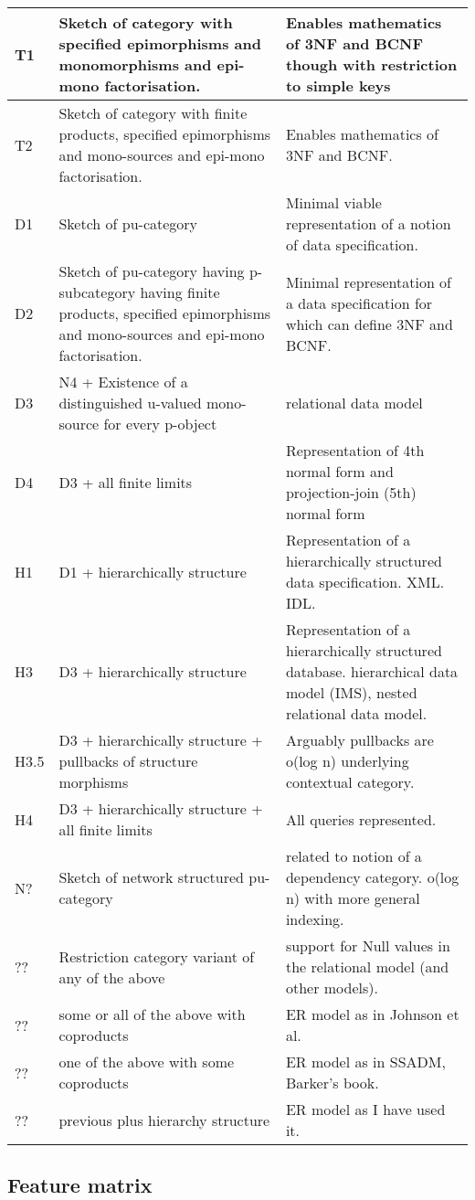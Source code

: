 \documentclass[10pt,a4paper]{article}
\theoremstyle{remark}
\begin{document}
\begin{tabular}{|l|p{6cm}|p{6cm}|}
\hline
T1 & Sketch of category with specified epimorphisms and monomorphisms and epi-mono factorisation.
   & Enables mathematics of 3NF and BCNF though with restriction to simple keys \\
\hline
T2 & Sketch of category with finite products, specified epimorphisms and mono-sources and epi-mono factorisation.
   & Enables mathematics of 3NF and BCNF. \\
\hline
D1 & Sketch of pu-category    
   & Minimal viable representation of a notion of data specification. \\
\hline
D2 & Sketch of pu-category having p-subcategory having finite products, 
     specified epimorphisms and mono-sources   and epi-mono factorisation.
   & Minimal representation of a data specification for which can define 3NF and BCNF. \\
\hline
D3 & N4 {\Large +} Existence of a distinguished u-valued mono-source for every p-object & relational data model \\
\hline 
D4 & D3 {\Large +} all finite limits 
   & Representation of 4th normal form and projection-join (5th) normal form  \\
\hline
H1 & D1 {\Large +} hierarchically structure
   &  Representation of a hierarchically structured data specification. XML. IDL. \\
\hline
H3 & D3  {\Large +} hierarchically structure
   &  Representation of a hierarchically structured database. hierarchical data model (IMS), nested relational data model. \\
\hline
H3.5 & D3  {\Large +} hierarchically structure + pullbacks of structure morphisms
   &  Arguably pullbacks are o(log n) underlying contextual category.\\
\hline
H4 & D3  {\Large +} hierarchically structure + all finite limits 
   &  All queries represented.\\
\hline
N? & Sketch of network structured pu-category
   & related to notion of a dependency category. o(log n) with more general indexing. \\
\hline
?? & Restriction category variant of any of the above 
   & support for Null values in the relational model (and other models). \\
\hline 
?? & some or all of the above with coproducts 
   & ER model as in Johnson et al. \\
\hline
?? & one of the above with some coproducts
   & ER model as in SSADM, Barker's book. \\
\hline
?? & previous plus hierarchy structure 
   & ER model as I have used it. \\
\hline
\end{tabular}
\fi


\subsection{Feature matrix}


\end{document}
